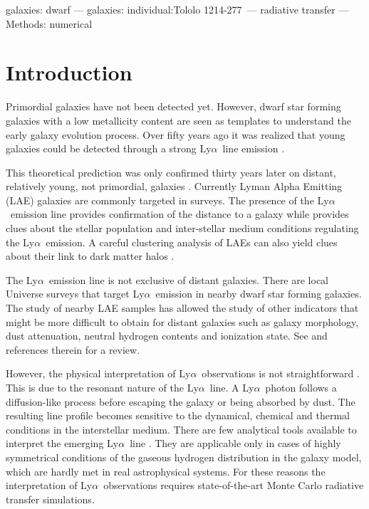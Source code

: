 \documentclass[a4,useAMS,usenatbib,usegraphicx]{mn2e}
\newcommand{\tol}{Tololo 1214-277}
\newcommand{\lya}{Ly$\alpha$}
\begin{document}
\begin{keywords}
galaxies: dwarf --- galaxies: individual:\tol\ --- radiative transfer --- Methods: numerical 
\end{keywords}



\section{Introduction}
\label{sec:introduction}





Primordial galaxies have not been detected yet. 
However, dwarf star forming galaxies with a low metallicity content
are seen as templates to understand the early galaxy evolution process. 
Over fifty years ago it was realized that young galaxies could be
detected through a strong \lya\ line emission \citep{PartridgePeebles}.    


This theoretical prediction was only confirmed thirty years later on
distant, relatively young, not primordial, galaxies \citep{1998ApJ...498L..93D}.
Currently Lyman Alpha Emitting (LAE) galaxies are commonly targeted
in surveys. 
The presence of the \lya\ emission line provides confirmation of
the distance to a galaxy while provides clues about the stellar
population and inter-stellar medium conditions regulating the
\lya\ emission.
A careful clustering analysis of LAEs can also yield clues about their link
to dark matter halos
\citep{2004AJ....128.2073H,2007ApJ...671..278G,2007ApJ...668...15K,2008MNRAS.391.1589O,2010MNRAS.409..184P,2013MNRAS.431.1777G,2016ApJ...828....5M}. 

The \lya\ emission line is not exclusive of distant galaxies. 
There are local Universe surveys that target \lya\ emission in nearby
dwarf star forming galaxies.
The study of nearby LAE samples has allowed the study of other
indicators that might be more difficult to obtain for distant galaxies
such as galaxy morphology, dust attenuation, neutral hydrogen contents and
ionization state. See \cite{Hayes15} and references therein for a review.

However, the physical interpretation of \lya\ observations is
not straightforward \citep{LARS,2015ApJ...805...14R}. 
This is due to the resonant nature of the \lya\ line. 
A \lya\ photon follows a diffusion-like process before escaping
the galaxy or being absorbed by dust. 
The resulting line profile becomes sensitive to the dynamical, chemical
and thermal conditions in the interstellar medium. 
There are few analytical tools available to interpret the
emerging \lya\ line
\citep{Harrington73,1991ApJ...370L..85N,LoebRybicki,2006ApJ...645..792T}. 
They are applicable only in cases of highly symmetrical
conditions of the gaseous hydrogen distribution in the galaxy model,
which are hardly met in real astrophysical systems. 
For these reasons the interpretation of \lya\ observations
requires state-of-the-art Monte Carlo radiative transfer simulations.   
\end{document}
